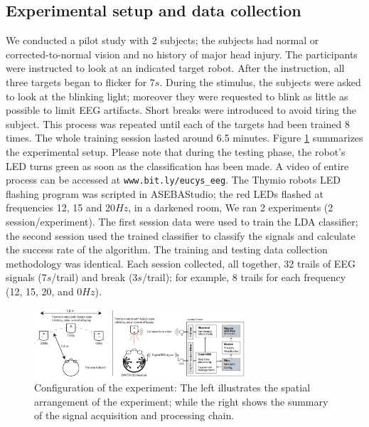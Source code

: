 \documentclass{svmult}
\begin{document}
\subsection{Experimental setup and data collection}
We conducted a pilot study with 2 subjects; the subjects had normal or corrected-to-normal vision and no history of major head injury. The participants were instructed to look at an indicated target robot. After the instruction, all three targets began to flicker for 7$s$. During the stimulus, the subjects were asked to look at the blinking light; moreover they were requested to blink as little as possible to limit EEG artifacts. Short breaks were introduced to avoid tiring the subject. This process was repeated until each of the targets had been trained 8 times. The whole training session lasted around 6.5 minutes. Figure \ref{fig:thymioinstall} summarizes the experimental setup. Please note that during the testing phase, the robot's LED turns green as soon as the classification has been made. A video of entire process can be accessed at \verb"www.bit.ly/eucys_eeg". The Thymio robots LED flashing program was scripted in ASEBAStudio; the red LEDs flashed at frequencies 12, 15 and 20$Hz$, in a darkened room, We ran 2 experiments (2 session/experiment). The first session data were used to train the LDA classifier; the second session used the trained classifier to classify the signals and calculate the success rate of the algorithm. The training and testing data collection methodology was identical. Each session collected, all together, 32 trails of EEG signals (7$s$/trail) and break (3$s$/trail); for example, 8 trails for each frequency (12, 15, 20, and 0$Hz$). 

\begin{figure}
\center
\includegraphics[width=0.7\textwidth]{figures/Untitled.png}
\caption{Configuration of the experiment: The left illustrates the spatial arrangement of the experiment; while the right shows the summary of the signal acquisition and processing chain.} \label{fig:thymioinstall}
\end{figure}
\end{document}
